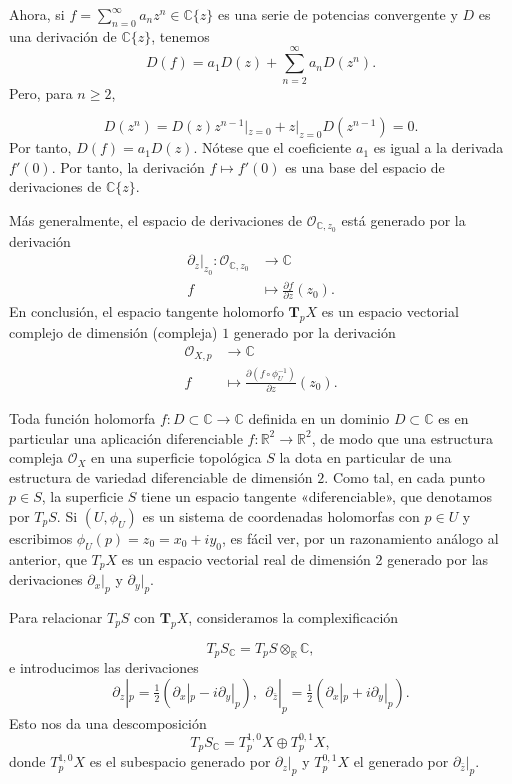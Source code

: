 \documentclass[12pt,a4paper]{article}
\theoremstyle{definition} \newtheorem{defn}[thm]{Definición}
\theoremstyle{definition} \newtheorem{ejemplo}[thm]{Ejemplo}
\theoremstyle{definition} \newtheorem{ejercicio}[thm]{Ejercicio}
\def\CC{\mathbb{C}}
\def\RR{\mathbb{R}}
\def\OO{\mathscr{O}}
\begin{document}
Ahora, si $f=\sum_{n=0}^\infty a_n z^n \in \CC\{z\}$ es una serie de potencias convergente y $D$ es una derivación de $\CC\{z\}$, tenemos
\begin{equation*}
  D (f) =  a_1 D(z) + \sum_{n=2}^\infty a_n D(z^n).
\end{equation*}
Pero, para $n\geq 2$,

\begin{equation*}
  D(z^n) = D(z) z^{n-1}|_{z=0} + z|_{z=0} D(z^{n-1}) = 0.
\end{equation*}
Por tanto, $D(f) = a_1 D(z)$. Nótese que el coeficiente $a_1$ es igual a la derivada $f'(0)$. Por tanto, la derivación $f\mapsto f'(0)$ es una base del espacio de derivaciones de $\CC\{z\}$.

Más generalmente, el espacio de derivaciones de $\OO_{\CC,z_0}$ está generado por la derivación
\begin{align*}
  \partial_z|_{z_0} :\OO_{\CC,z_0} &\longrightarrow \CC \\ 
  f &\longmapsto \frac{\partial f}{\partial z}(z_0). 
  \end{align*}
  En conclusión, el espacio tangente holomorfo $\boldsymbol{T}_pX$ es un espacio vectorial complejo de dimensión (compleja) $1$ generado por la derivación 
\begin{align*}
  \OO_{X,p} &\longrightarrow \CC \\ 
  f &\longmapsto \frac{\partial (f\circ \phi_U^{-1})}{\partial z}(z_0). 
  \end{align*}

  Toda función holomorfa $f:D\subset \CC \rightarrow \CC$ definida en un dominio $D\subset \CC$ es en particular una aplicación diferenciable $f:\RR^2 \rightarrow \RR^2$, de modo que una estructura compleja $\OO_X$ en una superficie topológica $S$ la dota en particular de una estructura de variedad diferenciable de dimensión $2$. Como tal, en cada punto $p\in S$, la superficie $S$ tiene un espacio tangente «diferenciable», que denotamos por $T_pS$. Si $(U,\phi_U)$ es un sistema de coordenadas holomorfas con $p\in U$ y escribimos $\phi_U(p)=z_0=x_0+iy_0$, es fácil ver, por un razonamiento análogo al anterior, que $T_pX$ es un espacio vectorial real de dimensión $2$ generado por las derivaciones $\partial_x|_p$ y $\partial_y|_p$. 

  Para relacionar $T_pS$ con $\boldsymbol{T}_p X$, consideramos la complexificación

  \begin{equation*}
    T_pS_{\CC} = T_p S \otimes_{\RR} \CC,
  \end{equation*}
  e introducimos las derivaciones
  \begin{equation*}
    \partial_z|_p = \tfrac{1}{2}(\partial_x|_p - i \partial_y|_p), \ \ \partial_{\bar{z}}|_p = \tfrac{1}{2} (\partial_x|_p + i \partial_y|_p).
  \end{equation*}
  Esto nos da una descomposición
  \begin{equation*}
    T_p S_\CC = T_p^{1,0} X \oplus T_p^{0,1} X,   
  \end{equation*}
  donde $T_p^{1,0}X$ es el subespacio generado por $\partial_z|_p$ y $T_p^{0,1} X$ el generado por $\partial_{\bar{z}}|_p$. 
\end{document}
